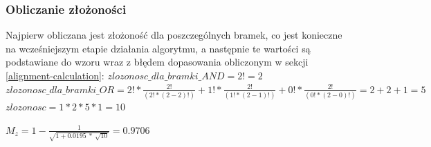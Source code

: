 \subsubsection{Obliczanie złożoności}
Najpierw obliczana jest złożoność dla poszczególnych bramek, co jest konieczne na wcześniejszym etapie działania algorytmu, a następnie te wartości są podstawiane do wzoru wraz z błędem dopasowania obliczonym w sekcji \ref{alignment-calculation}:\newline
$zlozonosc\_dla\_bramki\_AND = 2! = 2$\newline
$zlozonosc\_dla\_bramki\_OR = 2! * \frac{2!}{(2! * (2 - 2)!)} + 1! *  \frac{2!}{(1! * (2 - 1)!)} + 0! * \frac{2!}{(0! * (2 - 0)!)} = 2 + 2 + 1 = 5$\newline
$zlozonosc = 1 * 2 * 5 * 1 = 10$
\begin{center}
$M_z = 1 - \frac{1}{\sqrt{1 + 0.0195\ *\ \sqrt{10}}} = 0.9706$
\end{center}